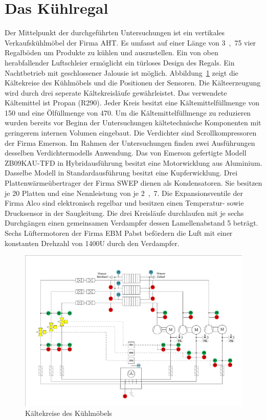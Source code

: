 \section{Das Kühlregal}
\label{sec:Das Kühlregal}

Der Mittelpunkt der durchgeführten Untersuchungen ist ein vertikales Verkaufskühlmöbel der Firma AHT.
Es umfasst auf einer Länge von \unit{3,75}{\metre} vier Regalböden um Produkte zu kühlen und auszustellen. Ein von oben herabfallender Luftschleier ermöglicht ein türloses Design des Regals. Ein Nachtbetrieb mit geschlossener Jalousie ist möglich. Abbildung~\ref{fig:IDC150} zeigt die Kältekreise des Kühlmöbels und die Positionen der Sensoren. Die Kälteerzeugung wird durch drei seperate Kältekreisläufe gewährleistet. Das verwendete Kältemittel ist Propan (R290). Jeder Kreis besitzt eine Kältemittelfüllmenge von \unit{150}{\gram} und eine Ölfüllmenge von \unit{470}{\gram}. Um die Kältemittelfüllmenge zu reduzieren wurden bereits vor Beginn der Untersuchungen kältetechnische Komponenten mit geringerem internen Volumen eingebaut. Die Verdichter sind Scrollkompressoren der Firma Emerson.  Im Rahmen der Untersuchungen finden zwei Ausführungen desselben Verdichtermodells Anwendung. Das von Emerson gefertigte Modell ZB09KAU-TFD in Hybridausführung besitzt eine Motorwicklung aus Aluminium. Dasselbe Modell in Standardausführung besitzt eine Kupferwicklung. Drei Plattenwärmeübertrager der Firma SWEP dienen als Kondensatoren. Sie besitzen je 20 Platten und eine Nennleistung von je \unit{2,7}{\kilo\watt}. Die Expansionsventile der Firma Alco sind elektronisch regelbar und besitzen einen Temperatur- sowie Drucksensor in der Saugleitung. Die drei Kreisläufe durchlaufen mit je sechs Durchgängen einen gemeinsamen Verdampfer dessen Lamellenabstand \unit{5}{\milli\metre} beträgt. Sechs Lüftermotoren der Firma EBM Pabst befördern die Luft mit einer konstanten Drehzahl von \unit{1400}{U\per\min} durch den Verdampfer.

\begin{figure} %
\centering
\includegraphics[scale=.5,angle=90]{Pictures/IDC150.pdf}
\caption{Kältekreise des Kühlmöbels}
\label{fig:IDC150}
\end{figure}


